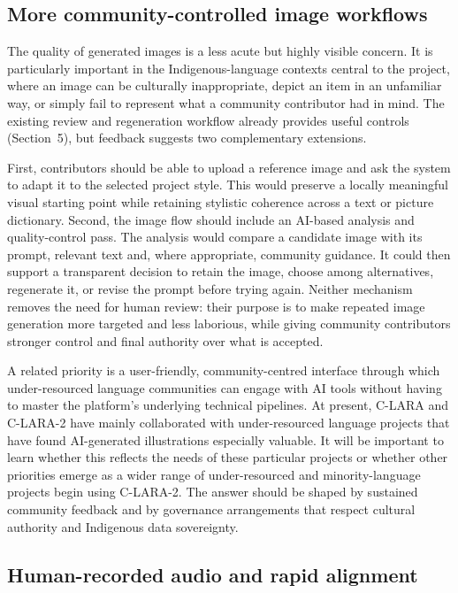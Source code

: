 \subsection{More community-controlled image workflows}

The quality of generated images is a less acute but highly visible concern.
It is particularly important in the Indigenous-language contexts central to the
project, where an image can be culturally inappropriate, depict an item in an
unfamiliar way, or simply fail to represent what a community contributor had
in mind. The existing review and regeneration workflow already provides useful
controls (Section~5), but feedback suggests two complementary extensions.

First, contributors should be able to upload a reference image and ask the
system to adapt it to the selected project style. This would preserve a
locally meaningful visual starting point while retaining stylistic coherence
across a text or picture dictionary. Second, the image flow should include an
AI-based analysis and quality-control pass. The analysis would compare a
candidate image with its prompt, relevant text and, where appropriate,
community guidance. It could then support a transparent decision to retain the
image, choose among alternatives, regenerate it, or revise the prompt before
trying again. Neither mechanism removes the need for human review: their
purpose is to make repeated image generation more targeted and less laborious,
while giving community contributors stronger control and final authority over
what is accepted.

A related priority is a user-friendly, community-centred interface through
which under-resourced language communities can engage with AI tools without
having to master the platform's underlying technical pipelines. At present,
C-LARA and C-LARA-2 have mainly collaborated with under-resourced language
projects that have found AI-generated illustrations especially valuable. It
will be important to learn whether this reflects the needs of these particular
projects or whether other priorities emerge as a wider range of under-resourced
and minority-language projects begin using C-LARA-2. The answer should be
shaped by sustained community feedback and by governance arrangements that
respect cultural authority and Indigenous data sovereignty.

\subsection{Human-recorded audio and rapid alignment}

